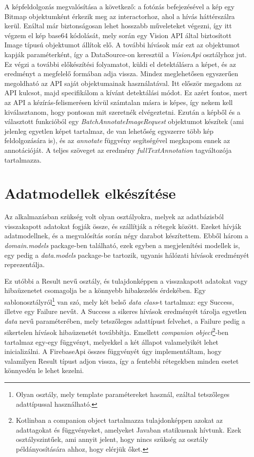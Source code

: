 A képfeldolgozás megvalósítása a következő: a fotózás befejezésével a kép egy Bitmap objektumként érkezik meg az interactorhoz, ahol a hívás háttérszálra kerül. Ezáltal már biztonságosan lehet hosszabb műveleteket végezni, így itt végzem el kép base64 kódolását, mely során egy Vision API által biztosított Image típusú objektumot állítok elő. A további hívások már ezt az objektumot kapják paraméterként, így a DataSource-on keresztül a \emph{VisionApi} osztályhoz jut. Ez végzi a további előkészítési folyamatot, küldi el detektálásra a képet, és az eredményt a megfelelő formában adja vissza. Mindez meglehetősen egyszerűen megoldható az API saját objektumainak használatával. Itt először megadom az API kulcsot, majd specifikálom a kívánt detektálási módot. Ez azért fontos, mert az API a kézírás-felismerésen kívül számtalan másra is képes, így nekem kell kiválasztanom, hogy pontosan mit szeretnék elvégeztetni. Ezután a képből és a választott funkcióból egy \emph{BatchAnnotateImageRequest} objektumot készítek (ami jelenleg egyetlen képet tartalmaz, de van lehetőség egyszerre több kép feldolgozására is), és az \emph{annotate} függvény segítségével megkapom ennek az annotációját. A teljes szöveget az eredmény \emph{fullTextAnnotation} tagváltozója tartalmazza.

\section{Adatmodellek elkészítése}
Az alkalmazásban szükség volt olyan osztályokra, melyek az adatbázisból visszakapott adatokat fogják össze, és szállítják a rétegek között. Ezeket hívják adatmodellnek, és a megvalósítás során négy darabot készítettem. Ebből három a \emph{domain.models} package-ben található, ezek egyben a megjelenítési modellek is, egy pedig a \emph{data.models} package-be tartozik, ugyanis hálózati hívások eredményét reprezentálja.

Ez utóbbi a Result nevű osztály, és tulajdonképpen a visszakapott adatokat vagy hibaüzenetet csomagolja be a könnyebb hibakezelés érdekében. Egy sablonosztályról\footnote{Olyan osztály, mely template paramétereket használ, ezáltal tetszőleges adattípussal használható.} van szó, mely két belső \emph{data class}-t tartalmaz: egy Success, illetve egy Failure nevűt. A Success a sikeres hívások eredményét tárolja egyetlen \emph{data} nevű paraméterében, mely tetszőleges adattípust felvehet, a Failure pedig a sikertelen hívások hibaüzenetét továbbítja. Emellett \emph{companion object}\footnote{Kotlinban a companion object tartalmazza tulajdonképpen azokat az adattagokat és függvényeket, amelyeket Javaban statikusnak hívtunk. Ezek osztályszintűek, ami annyit jelent, hogy nincs szükség az osztály példányosítására ahhoz, hogy elérjük őket.}-ben tartalmaz egy-egy függvényt, melyekkel a két állapot valamelyikét lehet inicializálni. A FirebaseApi összes függvényét úgy implementáltam, hogy valamilyen Result típust adjon vissza, így a fentebbi rétegekben minden esetet könnyedén le lehet kezelni.

